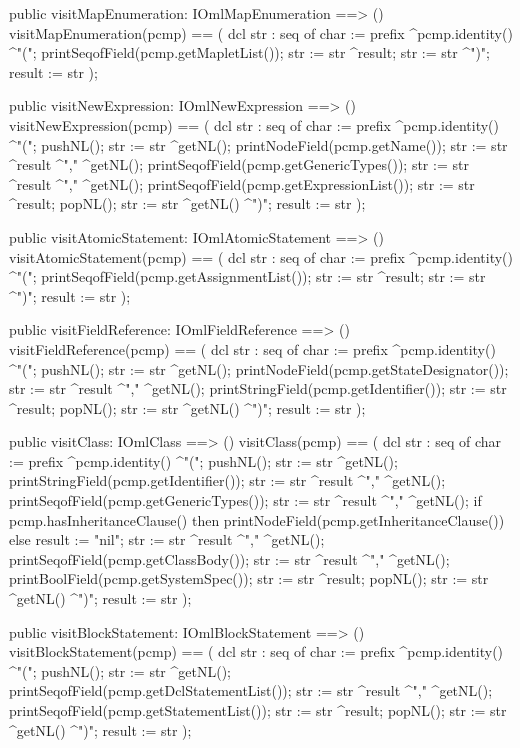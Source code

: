 \begin{vdm_al}
  public visitMapEnumeration: IOmlMapEnumeration ==> ()
  visitMapEnumeration(pcmp) ==
    ( dcl str : seq of char := prefix ^pcmp.identity() ^"(";
      printSeqofField(pcmp.getMapletList());
      str := str ^result;
      str := str ^")";
      result := str );

  public visitNewExpression: IOmlNewExpression ==> ()
  visitNewExpression(pcmp) ==
    ( dcl str : seq of char := prefix ^pcmp.identity() ^"(";
      pushNL();
      str := str ^getNL();
      printNodeField(pcmp.getName());
      str := str ^result ^"," ^getNL();
      printSeqofField(pcmp.getGenericTypes());
      str := str ^result ^"," ^getNL();
      printSeqofField(pcmp.getExpressionList());
      str := str ^result;
      popNL();
      str := str ^getNL() ^")";
      result := str );

  public visitAtomicStatement: IOmlAtomicStatement ==> ()
  visitAtomicStatement(pcmp) ==
    ( dcl str : seq of char := prefix ^pcmp.identity() ^"(";
      printSeqofField(pcmp.getAssignmentList());
      str := str ^result;
      str := str ^")";
      result := str );

  public visitFieldReference: IOmlFieldReference ==> ()
  visitFieldReference(pcmp) ==
    ( dcl str : seq of char := prefix ^pcmp.identity() ^"(";
      pushNL();
      str := str ^getNL();
      printNodeField(pcmp.getStateDesignator());
      str := str ^result ^"," ^getNL();
      printStringField(pcmp.getIdentifier());
      str := str ^result;
      popNL();
      str := str ^getNL() ^")";
      result := str );

  public visitClass: IOmlClass ==> ()
  visitClass(pcmp) ==
    ( dcl str : seq of char := prefix ^pcmp.identity() ^"(";
      pushNL();
      str := str ^getNL();
      printStringField(pcmp.getIdentifier());
      str := str ^result ^"," ^getNL();
      printSeqofField(pcmp.getGenericTypes());
      str := str ^result ^"," ^getNL();
      if pcmp.hasInheritanceClause()
      then printNodeField(pcmp.getInheritanceClause())
      else result := "nil";
      str := str ^result ^"," ^getNL();
      printSeqofField(pcmp.getClassBody());
      str := str ^result ^"," ^getNL();
      printBoolField(pcmp.getSystemSpec());
      str := str ^result;
      popNL();
      str := str ^getNL() ^")";
      result := str );

  public visitBlockStatement: IOmlBlockStatement ==> ()
  visitBlockStatement(pcmp) ==
    ( dcl str : seq of char := prefix ^pcmp.identity() ^"(";
      pushNL();
      str := str ^getNL();
      printSeqofField(pcmp.getDclStatementList());
      str := str ^result ^"," ^getNL();
      printSeqofField(pcmp.getStatementList());
      str := str ^result;
      popNL();
      str := str ^getNL() ^")";
      result := str );


\end{vdm_al}
